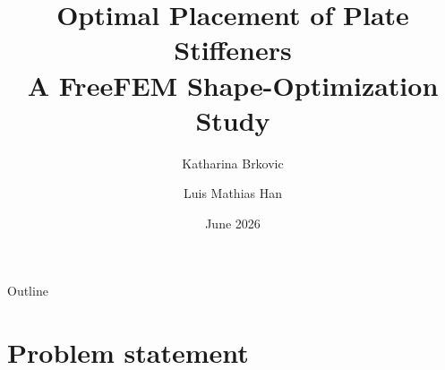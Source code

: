 \documentclass[10pt,c,intlimits,aspectratio=1610]{beamer}
\title[Optimal placement of plate stiffeners]%
{Optimal Placement of Plate Stiffeners\\[1mm]
 \large A FreeFEM Shape-Optimization Study}
\author[K.\,Brkovic, L.\,M.\,Han]{Katharina Brkovic \and Luis Mathias Han}
\institute{Optimization Methods for Sustainable Building Constructions}
\date{June 2026}
\begin{document}
\mytitle
\addtocounter{framenumber}{-1}

\begin{frame}{Outline}
  \tableofcontents
\end{frame}

\section{Problem statement}

\end{document}
